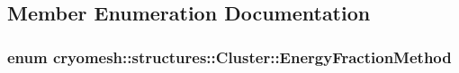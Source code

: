 \subsection{\-Member \-Enumeration \-Documentation}
\hypertarget{classcryomesh_1_1structures_1_1Cluster_a69c420b79675c6ffc9a0df8381ca9497}{
\subsubsection[{\-Energy\-Fraction\-Method}]{\setlength{\rightskip}{0pt plus 5cm}enum {\bf cryomesh\-::structures\-::\-Cluster\-::\-Energy\-Fraction\-Method}}}\label{classcryomesh_1_1structures_1_1Cluster_a69c420b79675c6ffc9a0df8381ca9497}
